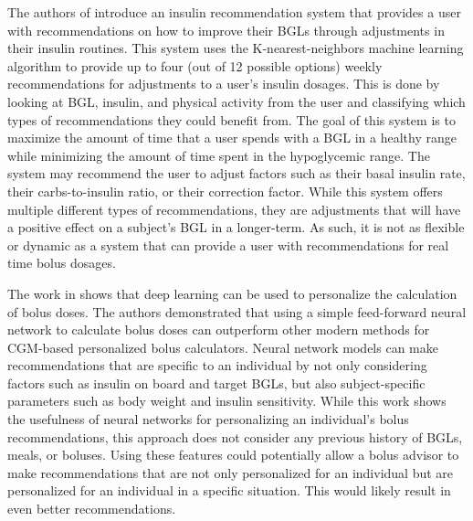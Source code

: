 The authors of \cite{tyler:knn} introduce an insulin recommendation system that provides a user with recommendations on how to improve their \ac{BGLs} through adjustments in their insulin routines. This system uses the K-nearest-neighbors machine learning algorithm to provide up to four (out of 12 possible options) weekly recommendations for adjustments to a user’s insulin dosages. This is done by looking at \ac{BGL}, insulin, and physical activity from the user and classifying which types of recommendations they could benefit from. The goal of this system is to maximize the amount of time that a user spends with a \ac{BGL} in a healthy range while minimizing the amount of time spent in the hypoglycemic range. The system may recommend the user to adjust factors such as their basal insulin rate, their carbs-to-insulin ratio, or their correction factor. While this system offers multiple different types of recommendations, they are adjustments that will have a positive effect on a subject’s \ac{BGL} in a longer-term. As such, it is not as flexible or dynamic as a system that can provide a user with recommendations for real time bolus dosages.

The work in \cite{cappon:bolus_nn} shows that deep learning can be used to personalize the calculation of bolus doses. The authors demonstrated that using a simple feed-forward neural network to calculate bolus doses can outperform other modern methods for \ac{CGM}-based personalized bolus calculators. Neural network models can make recommendations that are specific to an individual by not only considering factors such as insulin on board and target \ac{BGLs}, but also subject-specific parameters such as body weight and insulin sensitivity. While this work shows the usefulness of neural networks for personalizing an individual’s bolus recommendations, this approach does not consider any previous history of \ac{BGLs}, meals, or boluses. Using these features could potentially allow a bolus advisor to make recommendations that are not only personalized for an individual but are personalized for an individual in a specific situation. This would likely result in even better recommendations.

